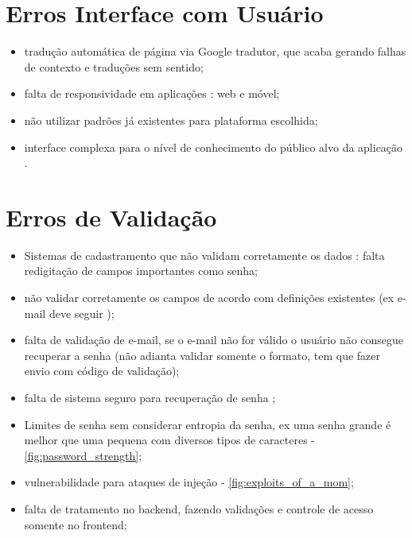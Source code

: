 \section{Erros Interface com Usuário}

\begin{itemize}
    \item tradução automática de página via Google tradutor, que acaba gerando falhas de contexto e traduções sem sentido;
    
    \item falta de responsividade em aplicações : web e móvel;
    
    \item não utilizar padrões já existentes para plataforma escolhida;
    
    \item interface complexa para o nível de conhecimento do público alvo da aplicação
    \newline
    \cite{computer_skills}.
    
\end{itemize}

\section{Erros de Validação}

\begin{itemize}
    \item Sistemas de cadastramento que não validam corretamente os dados : falta redigitação de campos importantes como senha;
    
    \item não validar corretamente os campos de acordo com definições existentes (ex e-mail deve seguir );
    
    \item falta de validação de e-mail, se o e-mail não for válido o usuário não consegue recuperar a senha (não adianta validar somente o formato, tem que fazer envio com código de validação);
    
    \item falta de sistema seguro para recuperação de senha \cite{forgot_password_cheat_sheet};
    
    \item Limites de senha sem considerar entropia da senha, ex uma senha grande é melhor que uma pequena com diversos tipos de caracteres - \autoref{fig:password_strength};

    \item vulnerabilidade para ataques de injeção - \autoref{fig:exploits_of_a_mom};
    
    \item falta de tratamento no backend, fazendo validações e controle de acesso somente no frontend;
    
\end{itemize}

